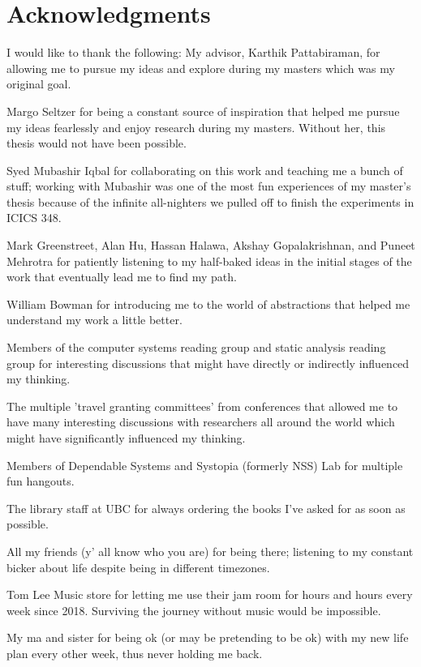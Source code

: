 
\chapter{Acknowledgments}

I would like to thank the following:
My advisor, Karthik Pattabiraman, for allowing me to pursue my ideas and explore during my masters which was my original goal. 

Margo Seltzer for being a constant source of inspiration that helped me pursue my ideas fearlessly and enjoy research during my masters. Without her, this thesis would not have been possible. 

Syed Mubashir Iqbal for collaborating on this work and teaching me a bunch of stuff; working with Mubashir was one of the most fun experiences of my master's thesis because of the infinite all-nighters we pulled off to finish the experiments in ICICS 348. 

Mark Greenstreet, Alan Hu, Hassan Halawa, Akshay Gopalakrishnan, and Puneet Mehrotra for patiently listening to my half-baked ideas in the initial stages of the work that eventually lead me to find my path. 

William Bowman for introducing me to the world of abstractions that helped me understand my work a little better.  

Members of the computer systems reading group and static analysis reading group for interesting discussions that might have directly or indirectly influenced my thinking. 

The multiple 'travel granting committees' from conferences that allowed me to have many interesting discussions with researchers all around the world which might have significantly influenced my thinking. 

Members of Dependable Systems and Systopia (formerly NSS) Lab for multiple fun hangouts. 

The library staff at UBC for always ordering the books I've asked for as soon as possible.

All my friends (y' all know who you are) for being there; listening to my constant bicker about life despite being in different timezones.   

Tom Lee Music store for letting me use their jam room for hours and hours every week since 2018. Surviving the journey without music would be impossible. 

My ma and sister for being ok (or may be pretending to be ok) with my new life plan every other week, thus never holding me back. 




